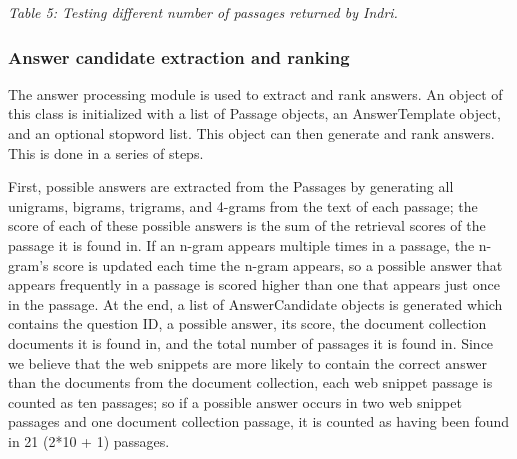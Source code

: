 \documentclass[11pt]{article}
\begin{document}
\begin{table}
\begin{center}

\vspace{1mm}
\emph{Table 5: Testing different number of passages returned by Indri.}
\end{center}
\end{table}

\subsubsection{Answer candidate extraction and ranking}

The answer processing module is used to extract and rank answers.  An object of this class is initialized with a list of Passage objects, an AnswerTemplate object, and an optional stopword list.  This object can then generate and rank answers.  This is done in a series of steps.

First, possible answers are extracted from the Passages by generating all unigrams, bigrams, trigrams, and 4-grams from the text of each passage; the score of each of these possible answers is the sum of the retrieval scores of the passage it is found in.  If an n-gram appears multiple times in a passage, the n-gram's score is updated each time the n-gram appears, so a possible answer that appears frequently in a passage is scored higher than one that appears just once in the passage. At the end, a list of AnswerCandidate objects is generated which contains the question ID, a possible answer, its score, the document collection documents it is found in, and the total number of passages it is found in.  Since we believe that the web snippets are more likely to contain the correct answer than the documents from the document collection, each web snippet passage is counted as ten passages; so if a possible answer occurs in two web snippet passages and one document collection passage, it is counted as having been found in 21 (2*10 + 1) passages.
\end{document}
